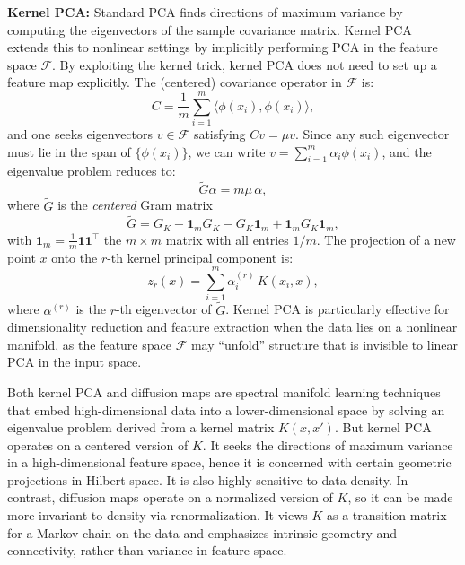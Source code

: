 \medskip
\noindent
\textbf{Kernel PCA:}
Standard PCA finds directions of maximum variance by computing the eigenvectors of the sample covariance matrix. Kernel PCA~\cite{scholkopf1998nonlinear} extends this to nonlinear settings by implicitly performing PCA in the feature space $\mathcal{F}$. 
By exploiting the kernel trick, kernel PCA does not need to set up a feature map explicitly.
The (centered) covariance operator in $\mathcal{F}$ is:
\begin{equation}
    C = \frac{1}{m}\sum_{i=1}^m \langle \phi(x_i), \phi(x_i)\rangle,
\end{equation}
and one seeks eigenvectors $v \in \mathcal{F}$ satisfying $Cv = \mu v$. Since any such eigenvector must lie in the span of $\{\phi(x_i)\}$, we can write $v = \sum_{i=1}^m \alpha_i \phi(x_i)$, and the eigenvalue problem reduces to:
\begin{equation}
    \tilde{G}\alpha = m\mu\, \alpha,
\end{equation}
where $\tilde{G}$ is the {\em centered} Gram matrix
\begin{equation}
    \tilde{G} = G_K - \mathbf{1}_m G_K - G_K\mathbf{1}_m + \mathbf{1}_m G_K \mathbf{1}_m,
\end{equation}
with $\mathbf{1}_m = \frac{1}{m}\mathbf{1}\mathbf{1}^\top$ the $m\times m$ matrix with all entries $1/m$. The projection of a new point $x$ onto the $r$-th kernel principal component is:
\begin{equation}
    z_r(x) = \sum_{i=1}^m \alpha_i^{(r)}\, K(x_i, x),
\end{equation}
where $\alpha^{(r)}$ is the $r$-th eigenvector of $\tilde{G}$. Kernel PCA is particularly effective for dimensionality reduction and feature extraction when the data lies on a nonlinear manifold, as the feature space $\mathcal{F}$ may ``unfold'' structure that is invisible to linear PCA in the input space.

\smallskip
Both kernel PCA and diffusion maps are spectral manifold learning techniques that embed high-dimensional data into a lower-dimensional space by solving an eigenvalue problem derived from a kernel matrix $K(x,x')$. But kernel PCA operates on a centered version of $K$. It seeks the directions of maximum variance in a high-dimensional feature space, hence it is concerned with certain geometric projections in Hilbert space. It is also highly sensitive to data density. In contrast, diffusion maps operate on a normalized version of $K$, so it can be made more invariant to density via renormalization. It views $K$ as a transition matrix for a Markov chain on the data and emphasizes intrinsic geometry and connectivity, rather than variance in feature space.


